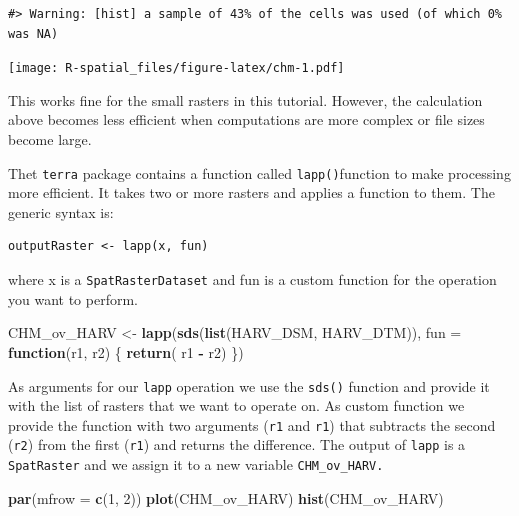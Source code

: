 \documentclass[
]{book}
\newenvironment{Shaded}{\begin{snugshade}}{\end{snugshade}}
\newcommand{\AttributeTok}[1]{\textcolor[rgb]{0.13,0.29,0.53}{#1}}
\newcommand{\ControlFlowTok}[1]{\textcolor[rgb]{0.13,0.29,0.53}{\textbf{#1}}}
\newcommand{\DecValTok}[1]{\textcolor[rgb]{0.00,0.00,0.81}{#1}}
\newcommand{\FunctionTok}[1]{\textcolor[rgb]{0.13,0.29,0.53}{\textbf{#1}}}
\newcommand{\NormalTok}[1]{#1}
\newcommand{\OtherTok}[1]{\textcolor[rgb]{0.56,0.35,0.01}{#1}}
\newcommand{\SpecialCharTok}[1]{\textcolor[rgb]{0.81,0.36,0.00}{\textbf{#1}}}
\begin{document}
\begin{verbatim}
#> Warning: [hist] a sample of 43% of the cells was used (of which 0% was NA)
\end{verbatim}

\texttt{[image: R-spatial\_files/figure-latex/chm-1.pdf]}

This works fine for the small rasters in this tutorial. However, the calculation above becomes less efficient when computations are more complex or file sizes become large.

Thet \texttt{terra} package contains a function called \texttt{lapp()}function to make processing more efficient. It takes two or more rasters and applies a function to them. The generic syntax is:

\begin{verbatim}
outputRaster <- lapp(x, fun)
\end{verbatim}

where x is a \texttt{SpatRasterDataset} and fun is a custom function for the operation you want to perform.

\begin{Shaded}
\begin{Highlighting}[]
\NormalTok{CHM\_ov\_HARV }\OtherTok{\textless{}{-}} \FunctionTok{lapp}\NormalTok{(}\FunctionTok{sds}\NormalTok{(}\FunctionTok{list}\NormalTok{(HARV\_DSM, HARV\_DTM)), }
                    \AttributeTok{fun =} \ControlFlowTok{function}\NormalTok{(r1, r2) \{ }
                      \FunctionTok{return}\NormalTok{( r1 }\SpecialCharTok{{-}}\NormalTok{ r2) }
\NormalTok{                      \})}
\end{Highlighting}
\end{Shaded}

As arguments for our \texttt{lapp} operation we use the \texttt{sds()} function and provide it with the list of rasters that we want to operate on. As custom function we provide the function with two arguments (\texttt{r1} and \texttt{r1}) that subtracts the second (\texttt{r2}) from the first (\texttt{r1}) and returns the difference. The output of \texttt{lapp} is a \texttt{SpatRaster} and we assign it to a new variable \texttt{CHM\_ov\_HARV.}

\begin{Shaded}
\begin{Highlighting}[]
\FunctionTok{par}\NormalTok{(}\AttributeTok{mfrow =} \FunctionTok{c}\NormalTok{(}\DecValTok{1}\NormalTok{, }\DecValTok{2}\NormalTok{))}
\FunctionTok{plot}\NormalTok{(CHM\_ov\_HARV)}
\FunctionTok{hist}\NormalTok{(CHM\_ov\_HARV)}
\end{Highlighting}
\end{Shaded}
\end{document}

